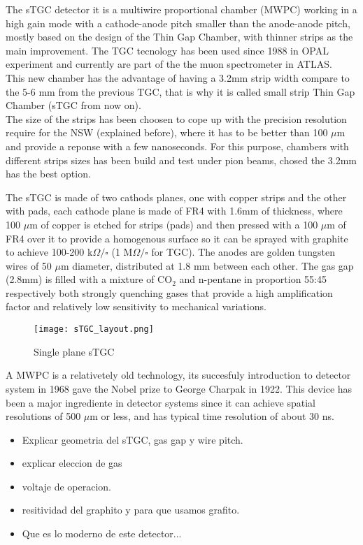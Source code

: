 The sTGC detector it is a multiwire proportional chamber (MWPC) working in a high gain mode with a cathode-anode pitch smaller than the anode-anode pitch, mostly based on the design of the Thin Gap Chamber\cite{tgc}, with thinner strips as the main improvement. The TGC tecnology has been used since 1988 in OPAL experiment and currently are part of the the muon spectrometer in ATLAS. \\
	This new  chamber has the advantage of having a 3.2mm strip width compare to the 5-6 mm from the previous TGC, that is why it is called small strip Thin Gap Chamber (sTGC from now on).\\ 
	The size of the strips has been choosen to cope up with the precision resolution require for the NSW (explained before), where it has to be better than 100 $\mu$m and provide a reponse with a few nanoseconds. For this purpose, chambers with different strips sizes has been build and test under pion beams, chosed the 3.2mm has the best option\cite{stripwidth}. \par

The sTGC is made of two cathods planes, one with copper strips and the other with pads, each cathode plane is made of FR4 with 1.6mm of thickness, where  100 $\mu$m of copper is etched for strips (pads) and then pressed with a 100 $\mu$m of FR4 over it to provide a homogenous surface so it can be sprayed with graphite to achieve 100-200 k$\Omega / \square$ (1 M$\Omega/\square$ for TGC). The anodes are golden tungsten wires of 50 $\mu$m diameter, distributed at 1.8 mm  between each other. The gas gap (2.8mm) is filled with a mixture of CO$_2$ and n-pentane in proportion 55:45 respectively both strongly quenching gases that provide a high amplification factor and relatively low sensitivity to mechanical variations.\\  



\begin{figure}[h]
		\centering
		\texttt{[image: sTGC\_layout.png]}
		\caption{Single plane sTGC}\label{fig:sTGC}
\end{figure}

A MWPC is a relativetely old technology, its succesfuly introduction to detector system in 1968 gave the Nobel prize to George Charpak in 1922. This device has been a major ingrediente in detector systems since it can achieve spatial resolutions of 500 $\mu$m or less, and has typical time resolution of about 30 ns.\\
\begin{itemize}
\item Explicar geometria del sTGC, gas gap y wire pitch.
\item explicar eleccion de gas
\item voltaje de operacion.
\item resitividad del graphito y para que usamos grafito.
\item Que es lo moderno de este detector...
\end{itemize}


